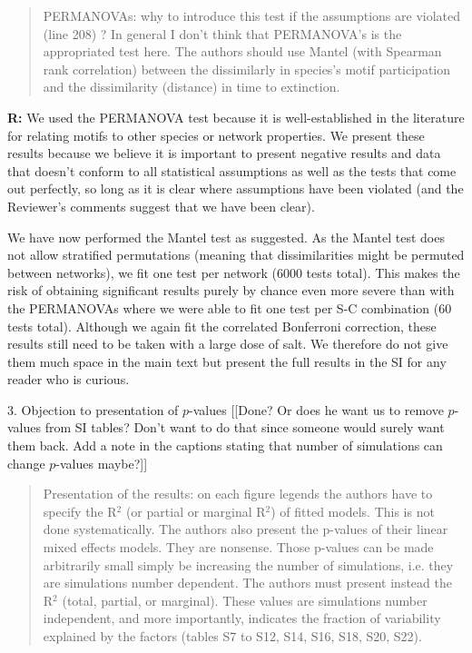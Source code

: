 \documentclass[12pt]{article}
\begin{document}
      \begin{quotation}
        PERMANOVAs: why to introduce this test if the assumptions are violated (line 208) ? In general I don’t think that PERMANOVA’s is the appropriated test here. The authors should use Mantel (with Spearman rank correlation) between the dissimilarly in species’s motif participation and the dissimilarity (distance) in time to extinction.
      \end{quotation}

      \smallskip

      \textbf{R:} We used the PERMANOVA test because it is well-established in the literature for relating motifs to other species or network properties. We present these results because we believe it is important to present negative results and data that doesn't conform to all statistical assumptions as well as the tests that come out perfectly, so long as it is clear where assumptions have been violated (and the Reviewer's comments suggest that we have been clear). 

      We have now performed the Mantel test as suggested. As the Mantel test does not allow stratified permutations (meaning that dissimilarities might be permuted between networks), we fit one test per network (6000 tests total). This makes the risk of obtaining significant results purely by chance even more severe than with the PERMANOVAs where we were able to fit one test per S-C combination (60 tests total). Although we again fit the correlated Bonferroni correction, these results still need to be taken with a large dose of salt. We therefore do not give them much space in the main text but present the full results in the SI for any reader who is curious.

    \smallskip

    3. Objection to presentation of $p$-values [[Done? Or does he want us to remove $p$-values from SI tables? Don't want to do that since someone would surely want them back. Add a note in the captions stating that number of simulations can change $p$-values maybe?]]

      \begin{quotation}
        Presentation of the results: on each figure legends the authors have to specify the R$^2$ (or partial  or marginal R$^2$) of fitted models. This is not done systematically. The authors also present the p-values of their linear mixed effects models. They are nonsense. Those p-values can be made arbitrarily small simply be increasing the number of simulations, i.e. they are simulations number dependent. The authors must present instead the R$^2$ (total, partial, or marginal). These values are simulations number independent, and more importantly, indicates the fraction of variability explained by the factors (tables S7 to S12, S14, S16, S18, S20, S22).
      \end{quotation}
\end{document}
